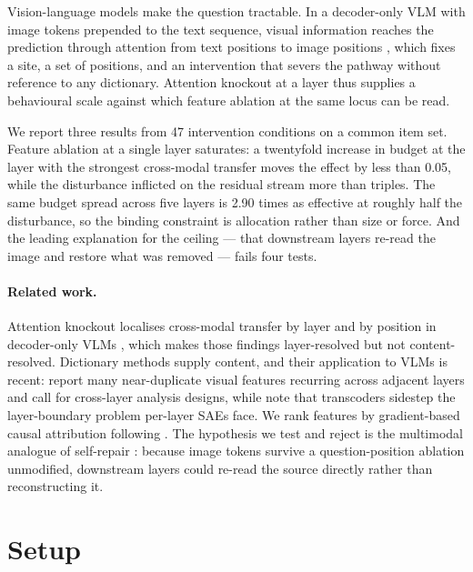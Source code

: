 \documentclass[11pt,a4paper]{article}
\begin{document}
Vision-language models make the question tractable. In a decoder-only VLM with
image tokens prepended to the text sequence, visual information reaches the
prediction through attention from text positions to image positions
\citep{zhang2024crossmodal,neo2025towards}, which fixes a site, a set of
positions, and an intervention that severs the pathway without reference to any
dictionary. Attention knockout at a layer thus supplies a behavioural scale
against which feature ablation at the same locus can be read.

We report three results from 47 intervention conditions on a common item set.
Feature ablation at a single layer saturates: a twentyfold increase in budget at
the layer with the strongest cross-modal transfer moves the effect by less than
0.05, while the disturbance inflicted on the residual stream more than triples.
The same budget spread across five layers is 2.90 times as effective at roughly
half the disturbance, so the binding constraint is allocation rather than size
or force. And the leading explanation for the ceiling --- that downstream layers
re-read the image and restore what was removed --- fails four tests.

\paragraph{Related work.} Attention knockout localises cross-modal transfer by
layer and by position in decoder-only VLMs \citep{zhang2024crossmodal,neo2025towards,jiang2025devils},
which makes those findings layer-resolved but not content-resolved. Dictionary
methods supply content, and their application to VLMs is recent:
\citet{yang2026monet} report many near-duplicate visual features recurring
across adjacent layers and call for cross-layer analysis designs, while
\citet{lindsey2025circuittracing} note that transcoders sidestep the
layer-boundary problem per-layer SAEs face. We rank features by gradient-based
causal attribution following \citet{marks2024sparsefeaturecircuits}. The
hypothesis we test and reject is the multimodal analogue of self-repair
\citep{mcgrath2023hydra,rushing2024selfrepair}: because image tokens survive a
question-position ablation unmodified, downstream layers could re-read the
source directly rather than reconstructing it.

\section{Setup}
\end{document}
